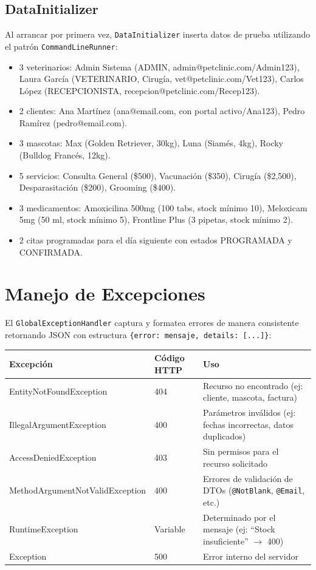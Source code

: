\subsection{DataInitializer}

Al arrancar por primera vez, \texttt{DataInitializer} inserta datos de prueba utilizando el patr\'on \texttt{CommandLineRunner}:

\begin{itemize}
    \item 3 veterinarios: Admin Sistema (ADMIN, admin@petclinic.com/Admin123), Laura Garc\'ia (VETERINARIO, Cirug\'ia, vet@petclinic.com/Vet123), Carlos L\'opez (RECEPCIONISTA, recepcion@petclinic.com/Recep123).
    \item 2 clientes: Ana Mart\'inez (ana@email.com, con portal activo/Ana123), Pedro Ram\'irez (pedro@email.com).
    \item 3 mascotas: Max (Golden Retriever, 30kg), Luna (Siam\'es, 4kg), Rocky (Bulldog Franc\'es, 12kg).
    \item 5 servicios: Consulta General (\$500), Vacunaci\'on (\$350), Cirug\'ia (\$2,500), Desparasitaci\'on (\$200), Grooming (\$400).
    \item 3 medicamentos: Amoxicilina 500mg (100 tabs, stock m\'inimo 10), Meloxicam 5mg (50 ml, stock m\'inimo 5), Frontline Plus (3 pipetas, stock m\'inimo 2).
    \item 2 citas programadas para el d\'ia siguiente con estados PROGRAMADA y CONFIRMADA.
\end{itemize}

\section{Manejo de Excepciones}

El \texttt{GlobalExceptionHandler} captura y formatea errores de manera consistente retornando JSON con estructura \texttt{\{error: mensaje, details: [...]\}}:

\begin{longtable}{|p{5cm}|p{4cm}|p{5cm}|}
\hline
\textbf{Excepci\'on} & \textbf{C\'odigo HTTP} & \textbf{Uso} \\
\hline
EntityNotFoundException & 404 & Recurso no encontrado (ej: cliente, mascota, factura) \\
\hline
IllegalArgumentException & 400 & Par\'ametros inv\'alidos (ej: fechas incorrectas, datos duplicados) \\
\hline
AccessDeniedException & 403 & Sin permisos para el recurso solicitado \\
\hline
MethodArgumentNotValidException & 400 & Errores de validaci\'on de DTOs (\texttt{@NotBlank}, \texttt{@Email}, etc.) \\
\hline
RuntimeException & Variable & Determinado por el mensaje (ej: ``Stock insuficiente'' $\rightarrow$ 400) \\
\hline
Exception & 500 & Error interno del servidor \\
\hline
\end{longtable}
